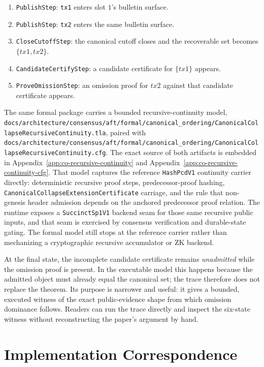 \documentclass[11pt]{article}
\newcommand{\code}[1]{\texttt{#1}}
\begin{document}
\begin{enumerate}[leftmargin=1.5em]
\item \code{PublishStep}: \code{tx1} enters slot \(1\)'s bulletin surface.
\item \code{PublishStep}: \code{tx2} enters the same bulletin surface.
\item \code{CloseCutoffStep}: the canonical cutoff closes and the recoverable
set becomes \(\{tx1, tx2\}\).
\item \code{CandidateCertifyStep}: a candidate certificate for \(\{tx1\}\)
appears.
\item \code{ProveOmissionStep}: an omission proof for \(tx2\) against that
candidate certificate appears.
\end{enumerate}

The same formal package carries a bounded recursive-continuity model,
\code{docs/architecture/consensus/aft/formal/canonical\_ordering/CanonicalCollapseRecursiveContinuity.tla},
paired with
\code{docs/architecture/consensus/aft/formal/canonical\_ordering/CanonicalCollapseRecursiveContinuity.cfg}.
The exact source of both artifacts is embedded in
Appendix~\ref{app:co-recursive-continuity} and
Appendix~\ref{app:co-recursive-continuity-cfg}.
That model captures the reference \code{HashPcdV1} continuity carrier directly:
deterministic recursive proof steps, predecessor-proof hashing,
\code{CanonicalCollapseExtensionCertificate} carriage, and the rule that
non-genesis header admission depends on the anchored predecessor proof relation.
The runtime exposes a \code{SuccinctSp1V1} backend seam for those
same recursive public inputs, and that seam is exercised by consensus
verification and durable-state gating. The formal model still stops at the
reference carrier rather than mechanizing a cryptographic recursive
accumulator or ZK backend.

At the final state, the incomplete candidate certificate remains
\emph{unadmitted} while the omission proof is present. In the executable
model this happens because the admitted object must already equal the canonical
set; the trace therefore does not replace the theorem. Its purpose is narrower
and useful: it gives a bounded, executed witness of the exact public-evidence
shape from which omission dominance follows. Readers can run the trace directly
and inspect the six-state witness without reconstructing the paper's argument by
hand.

\section{Implementation Correspondence}
\end{document}
